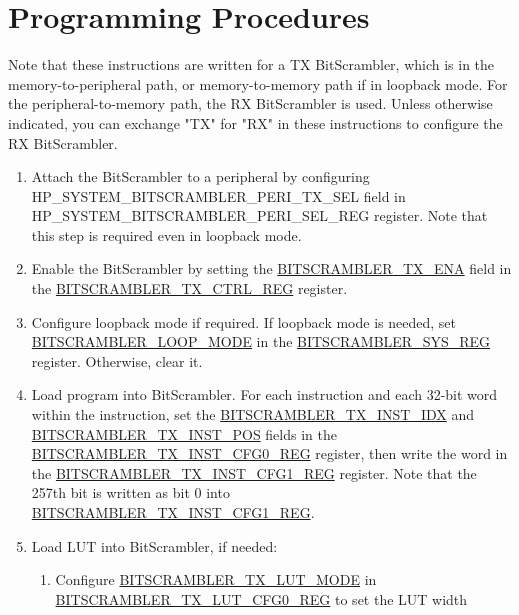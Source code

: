 \documentclass[main\_\_EN.tex]{subfiles}
\begin{document}

\section{Programming Procedures}
\label{sec:bitscrm-prog-procedures}

Note that these instructions are written for a TX BitScrambler, which is in the memory-to-peripheral path, or memory-to-memory path if in loopback mode. For the peripheral-to-memory path, the RX BitScrambler is used. Unless otherwise indicated, you can exchange "TX" for "RX" in these instructions to configure the RX BitScrambler.


\begin{enumerate}
    \item Attach the BitScrambler to a peripheral by configuring HP\_SYSTEM\_BITSCRAMBLER\_PERI\_TX\_SEL field in HP\_SYSTEM\_BITSCRAMBLER\_PERI\_SEL\_REG register. Note that this step is required even in loopback mode.
    \item Enable the BitScrambler by setting the \hyperref[fielddesc:BITSCRAMBLERTXENA]{BITSCRAMBLER\_TX\_ENA} field in the \hyperref[regdesc:BITSCRAMBLERTXCTRLREG]{BITSCRAMBLER\_TX\_CTRL\_REG} register.
    \item Configure loopback mode if required. If loopback mode is needed, set \hyperref[fielddesc:BITSCRAMBLERLOOPMODE]{BITSCRAMBLER\_LOOP\_MODE} in the \hyperref[regdesc:BITSCRAMBLERSYSREG]{BITSCRAMBLER\_SYS\_REG} register. Otherwise, clear it.
    \item Load program into BitScrambler. For each instruction and each 32-bit word within the instruction, set the \hyperref[fielddesc:BITSCRAMBLERTXINSTIDX]{BITSCRAMBLER\_TX\_INST\_IDX} and \hyperref[fielddesc:BITSCRAMBLERTXINSTPOS]{BITSCRAMBLER\_TX\_INST\_POS} fields in the \hyperref[regdesc:BITSCRAMBLERTXINSTCFG0REG]{BITSCRAMBLER\_TX\_INST\_CFG0\_REG} register, then write the word in the \hyperref[regdesc:BITSCRAMBLERTXINSTCFG1REG]{BITSCRAMBLER\_TX\_INST\_CFG1\_REG} register. Note that the 257th bit is written as bit 0 into \hyperref[regdesc:BITSCRAMBLERTXINSTCFG1REG]{BITSCRAMBLER\_TX\_INST\_CFG1\_REG}.
    \item Load LUT into BitScrambler, if needed:
    \begin{enumerate}
        \item Configure \hyperref[fielddesc:BITSCRAMBLERTXLUTMODE]{BITSCRAMBLER\_TX\_LUT\_MODE} in \hyperref[regdesc:BITSCRAMBLERTXLUTCFG0REG]{BITSCRAMBLER\_TX\_LUT\_CFG0\_REG} to set the LUT width

\end{enumerate}
\end{enumerate}
\end{document}
